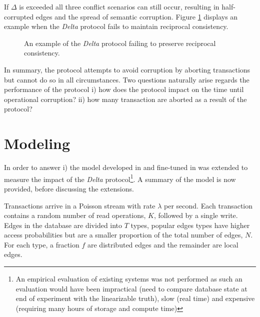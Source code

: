 \documentclass[sigplan,10pt]{acmart}
\begin{document}
If $\Delta$ is exceeded all three conflict scenarios can still occur, resulting in half-corrupted edges and the spread of semantic corruption. Figure \ref{corruption-again} displays an example when the \emph{Delta} protocol fails to maintain reciprocal consistency.

\begin{figure}[H]
  \centering
  \caption{An example of the \emph{Delta} protocol failing to preserve reciprocal consistency.}
  \label{corruption-again}
\end{figure}

In summary, the protocol attempts to avoid corruption by aborting transactions but cannot do so in all circumstances. Two questions naturally arise regards the performance of the protocol i) how does the protocol impact on the time until operational corruption? ii) how many transaction are aborted as a result of the protocol?


\section{Modeling}
\label{sec:modeling}

In order to answer i) the model developed in \cite{Ezhilchelvan2018} and fine-tuned in \cite{Webber2019} was extended to measure the impact of the \emph{Delta} protocol\footnote{An empirical evaluation of existing systems was not performed as such an evaluation would have been impractical (need to compare database state at end of experiment with the linearizable truth), slow (real time) and expensive (requiring many hours of storage and compute time)}. A summary of the model is now provided, before discussing the extensions.

Transactions arrive in a Poisson stream with rate $\lambda$ per second. Each transaction contains a random number of read operations, $K$, followed by a single write. Edges in the database are divided into $T$ types, popular edges types have higher access probabilities but are a smaller proportion of the total number of edges, $N$. For each type, a fraction $f$ are distributed edges and the remainder are local edges.
\end{document}
